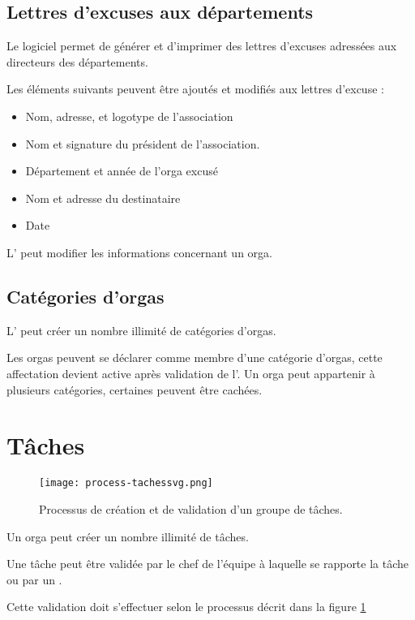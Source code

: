 \subsection{Lettres d'excuses aux départements}
Le logiciel permet de générer et d'imprimer des lettres d'excuses adressées aux directeurs des départements.

Les éléments suivants peuvent être ajoutés et modifiés aux lettres d'excuse : 
\begin{itemize}
 \item Nom, adresse, et logotype de l'association
\item Nom et signature du président de l'association.
\item Département et année de l'orga excusé
\item Nom et adresse du destinataire
\item Date
\end{itemize}


L' \oh{} peut modifier les informations concernant un orga.


\subsection{Catégories d'orgas}
L'\oh{} peut créer un nombre illimité de catégories d'orgas.

Les orgas peuvent se déclarer comme membre d'une catégorie d'orgas, cette affectation devient active après validation de l'\oh{}. Un orga peut appartenir à plusieurs catégories, certaines peuvent être cachées.

\section{Tâches}

\begin{figure}[h!t]
\centering
\texttt{[image: process-tachessvg.png]}
\label{fig:ptaches}
\caption{Processus de création et de validation d'un groupe de tâches.}
\end{figure}


Un orga peut créer un nombre illimité de tâches.

Une tâche peut être validée par le chef de l'équipe à laquelle se rapporte la tâche ou par un \oh{}.

Cette validation doit s'effectuer selon le processus décrit dans la figure \ref{fig:ptaches}

